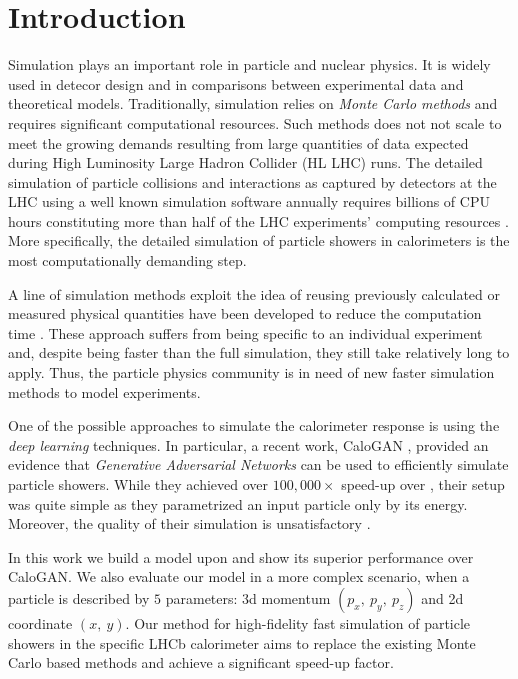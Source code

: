 \section{Introduction}

Simulation plays an important role in particle and nuclear physics. It is widely used in detecor design and in comparisons between experimental data and theoretical models. Traditionally, simulation relies on \textit{Monte Carlo methods} and requires significant computational resources. Such methods does not not scale to meet the growing demands resulting from large quantities of data expected during High Luminosity Large Hadron Collider (HL LHC) runs. The detailed simulation of particle collisions and interactions as captured by detectors at the LHC using a well known simulation software \geant annually requires billions of CPU hours constituting more than half of the LHC experiments' computing resources \cite{bozzi2014, flynn2015computing}. More specifically, the detailed simulation of particle showers in calorimeters is the most computationally demanding step.
 
A line of simulation methods exploit the idea of reusing previously calculated or measured physical quantities have been developed to reduce the computation time \cite{grindhammer2000parameterized,atlas2010simulation}. These approach suffers from being specific to an individual experiment and, despite being faster than the full simulation, they still take relatively long to apply. Thus, the particle physics community is in need of new faster simulation methods to model experiments. 
    
One of the possible approaches to simulate the calorimeter response is using the \textit{deep learning} techniques. In particular, a recent work, CaloGAN \cite{paganini2017calogan}, provided an evidence that \textit{Generative Adversarial Networks} can be used to efficiently simulate particle showers. While they achieved over $100,000 \times$ speed-up over \geant, their setup was quite simple as they parametrized an input particle only by its energy. Moreover, the quality of their simulation is unsatisfactory . 

In this work we build a model upon  and show its superior performance over CaloGAN. We also evaluate our model in a more complex scenario, when a particle is described by $5$ parameters: 3d momentum $(p_x,~ p_y,~ p_z)$ and 2d coordinate $(x,~ y)$. Our method for high-fidelity fast simulation of particle showers in the specific LHCb calorimeter aims to replace the existing Monte Carlo based methods and achieve a significant speed-up factor.
 



